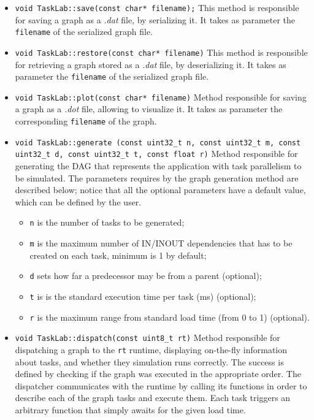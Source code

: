 \begin{itemize}
\item \texttt{void TaskLab::save(const char* filename);} \newline
This method is responsible for saving a graph as a \textit{.dat} file, by serializing it. It takes as parameter the \texttt{filename} of the serialized graph file.

\item \texttt{void TaskLab::restore(const char* filename)} \newline
This method is responsible for retrieving a graph stored as a \textit{.dat} file, by deserializing it. It takes as parameter the \texttt{filename} of the serialized graph file.

\item \texttt{void TaskLab::plot(const char* filename)} \newline
Method responsible for saving a graph as a \textit{.dot} file, allowing to visualize it. It takes as parameter the corresponding \texttt{filename} of the graph.

\item \texttt{\noindent void TaskLab::generate \newline
(const uint32\_t n, const uint32\_t m, const uint32\_t d, \newline
 const uint32\_t t, const float r)} \newline
Method responsible for generating the DAG that represents the application with task parallelism to be simulated. The parameters requires by the graph generation method are described below; notice that all the optional parameters have a default value, which can be defined by the user.
\begin{itemize}
\item \texttt{n} is the number of tasks to be generated; 
\item \texttt{m} is the maximum number of IN/INOUT dependencies that has to be created on each task, minimum is 1 by default; 
\item \texttt{d} sets how far a predecessor may be from a parent (optional); 
\item \texttt{t} is is the standard execution time per task (ms) (optional); 
\item \texttt{r} is the maximum range from standard load time (from 0 to 1) (optional). 
\end{itemize}

\item \texttt{void TaskLab::dispatch(const uint8\_t rt)} \newline
Method responsible for dispatching a graph to the \texttt{rt} runtime, displaying on-the-fly information about tasks, and whether they simulation runs correctly. The success is defined by checking if the graph was executed in the appropriate order. The dispatcher communicates with the runtime by calling its functions in order to describe each of the graph tasks and execute them. Each task triggers an arbitrary function that simply awaits for the given load time.


\end{itemize}

